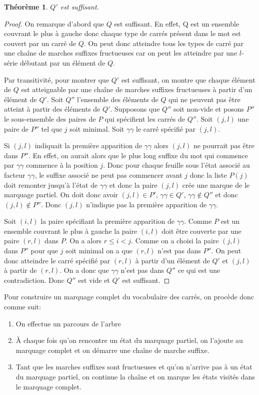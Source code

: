 \documentclass[10pt,letterpaper,oneside]{article}
\newtheorem{theorem}{Théorème}
\begin{document}
\begin{theorem} \label{thm:suffisance}
    $Q'$ est suffisant.
\end{theorem}
\begin{proof}
    On remarque d'abord que $Q$ est suffisant.
    En effet, Q est un ensemble couvrant le plus à gauche donc chaque type de carrés présent dans le mot est couvert par un carré de $Q$.
    On peut donc atteindre tous les types de carré par une chaîne de marches suffixes fructueuses car on peut les atteindre par une $l$-série débutant par un élément de $Q$.
    
    Par transitivité, pour montrer que $Q'$ est suffisant, on montre que chaque élément de $Q$ est atteignable par une chaîne de marches suffixes fructueuses à partir d'un élément de $Q'$.
    Soit $Q''$ l'ensemble des éléments de $Q$ qui ne peuvent pas être atteint à partir des éléments de $Q'$. Supposons que $Q''$ soit non-vide et posons $P''$ le sous-ensemble des paires de $P$ qui spécifient les carrés de $Q''$. Soit $(j,l)$ une paire de $P''$ tel que $j$ soit minimal. Soit $\gamma\gamma$ le carré spécifié par $(j,l)$.
    
    Si $(j,l)$ indiquait la première apparition de $\gamma\gamma$ alors $(j,l)$ ne pourrait pas être dans $P''$. En effet, on aurait alors que le plus long suffixe du mot qui commence par $\gamma\gamma$ commence à la position $j$. Donc pour chaque feuille sous l'état associé au facteur $\gamma\gamma$, le suffixe associé ne peut pas commencer avant $j$ donc la liste $P(j)$ doit remonter jusqu'à l'état de $\gamma\gamma$ et donc la paire $(j,l)$ crée une marque de le marquage partiel. On doit donc avoir $(j,l)\in P'$, $\gamma\gamma\in Q'$, $\gamma\gamma\not\in Q''$ et donc $(j,l)\not\in P''$. Donc $(j,l)$ n'indique pas la première apparition de $\gamma\gamma$.
    
    Soit $(i,l)$ la paire spécifiant la première apparition de $\gamma\gamma$. Comme $P$ est un ensemble couvrant le plus à gauche la paire $(i,l)$ doit être couverte par une paire $(r,l)$ dans $P$. On a alors $r\leq i<j$. Comme on a choisi la paire $(j,l)$ dans $P''$ pour que $j$ soit minimal on a que $(r,l)$ n'est pas dans $P''$. On peut donc atteindre le carré spécifié par $(r,l)$ à partir d'un élément de $Q'$ et $(j,l)$ à partir de $(r,l)$. On a donc que $\gamma\gamma$ n'est pas dans $Q''$ ce qui est une contradiction. Donc $Q''$ est vide et $Q'$ est suffisant.
\end{proof}

Pour construire un marquage complet du vocabulaire des carrés, on procède donc comme suit:
\begin{enumerate}
    \item On effectue un parcours de l'arbre
    \item À chaque fois qu'on rencontre un état du marquage partiel, on l'ajoute au marquage complet et on démarre une chaîne de marche suffixe.
    \item Tant que les marches suffixes sont fructueuses et qu'on n'arrive pas à un état du marquage partiel, on continue la chaîne et on marque les états visités dans le marquage complet.
\end{enumerate}
\end{document}
